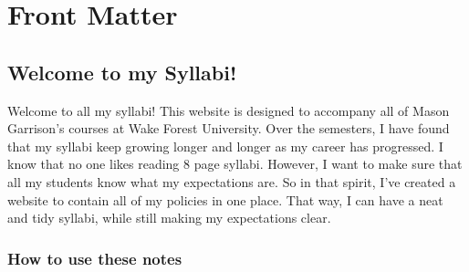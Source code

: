 \endgroup

\cleardoublepage
{} %

\cleardoublepage %




\hypertarget{part-front-matter}{%
\part*{Front Matter}\label{part-front-matter}}


\hypertarget{welcome-to-my-syllabi}{%
\chapter*{Welcome to my Syllabi!}\label{welcome-to-my-syllabi}}


Welcome to all my syllabi! This website is designed to accompany all of Mason Garrison's courses at Wake Forest University.
Over the semesters, I have found that my syllabi keep growing longer and longer as my career has progressed.
I know that no one likes reading 8 page syllabi.
However, I want to make sure that all my students know what my expectations are.
So in that spirit, I've created a website to contain all of my policies in one place.
That way, I can have a neat and tidy syllabi, while still making my expectations clear.

\hypertarget{how-to-use-these-notes}{%
\section*{How to use these notes}\label{how-to-use-these-notes}}


